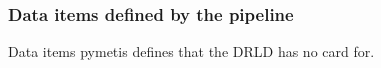 






\subsubsection{Data items defined by the pipeline}
Data items pymetis defines that the DRLD has no card for.

